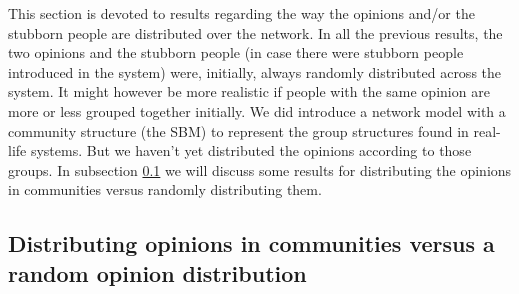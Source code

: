 \documentclass[11 pt , letterpaper , twoside , openright]{book}
\begin{document}
This section is devoted to results regarding the way the opinions and/or the stubborn people are distributed over the network. In all the previous results, the two opinions and the stubborn people (in case there were stubborn people introduced in the system) were, initially, always randomly distributed across the system. It might however be more realistic if people with the same opinion are more or less grouped together initially. We did introduce a network model with a community structure (the SBM) to represent the group structures found in real-life systems. But we haven't yet distributed the opinions according to those groups. In subsection \ref{groupVSrandom} we will discuss some results for distributing the opinions in communities versus randomly distributing them.

\subsection{Distributing opinions in communities versus a random opinion distribution}\label{groupVSrandom}
\end{document}
